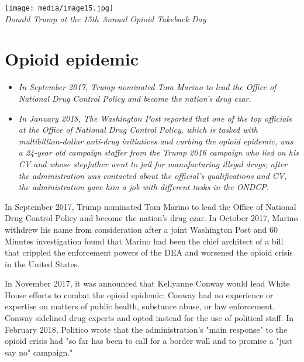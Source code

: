 \texttt{[image: media/image15.jpg]}\\
\emph{Donald Trump at the 15th Annual Opioid Takeback Day}

\section{Opioid epidemic}\label{opioid-epidemic}

\begin{itemize}
\item
  \emph{In September 2017, Trump nominated Tom Marino to lead the Office
  of National Drug Control Policy and become the nation's drug czar.}
\item
  \emph{In January 2018, The Washington Post reported that one of the
  top officials at the Office of National Drug Control Policy, which is
  tasked with multibillion-dollar anti-drug initiatives and curbing the
  opioid epidemic, was a 24-year old campaign staffer from the Trump
  2016 campaign who lied on his CV and whose stepfather went to jail for
  manufacturing illegal drugs; after the administration was contacted
  about the official's qualifications and CV, the administration gave
  him a job with different tasks in the ONDCP.}
\end{itemize}

In September 2017, Trump nominated Tom Marino to lead the Office of
National Drug Control Policy and become the nation's drug czar. In
October 2017, Marino withdrew his name from consideration after a joint
Washington Post and 60 Minutes investigation found that Marino had been
the chief architect of a bill that crippled the enforcement powers of
the DEA and worsened the opioid crisis in the United States.

In November 2017, it was announced that Kellyanne Conway would lead
White House efforts to combat the opioid epidemic; Conway had no
experience or expertise on matters of public health, substance abuse, or
law enforcement. Conway sidelined drug experts and opted instead for the
use of political staff. In February 2018, Politico wrote that the
administration's "main response" to the opioid crisis had "so far has
been to call for a border wall and to promise a "just say no" campaign."

